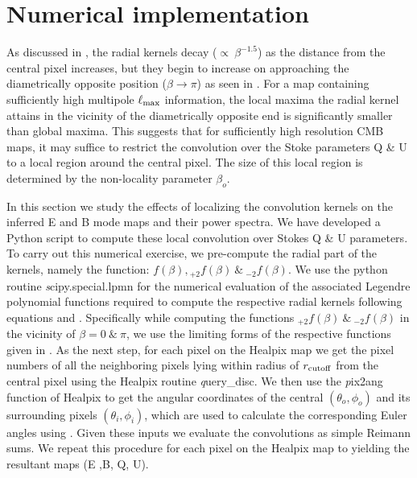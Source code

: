 \section{Numerical implementation} \label{sec:numerical_implementation}

As discussed in , the radial kernels decay ($\propto ~ \beta^{-1.5}$) as the distance from the central pixel increases, but they begin to increase on approaching the diametrically opposite position ($\beta \rightarrow \pi$)  as seen in . For a map containing sufficiently high multipole $\ell_{\rm max}$ information,  the local maxima the radial kernel attains in the vicinity of the diametrically opposite end is significantly smaller than global maxima. This suggests that for sufficiently high resolution CMB maps, it may suffice to restrict the convolution over the Stoke parameters Q \& U to a local region around the central pixel. The size of this local region is determined by the non-locality parameter $\beta_o$. 

In this section we study the effects of localizing the convolution kernels on the inferred E and B mode maps and their power spectra. We have developed a Python script to compute these local convolution over Stokes Q \& U parameters. To carry out this numerical exercise, we pre-compute the radial part of the kernels, namely the function: $f(\beta), {}_{+2}f(\beta) ~\&~ {}_{-2}f(\beta)$. We use the python routine {\textit scipy.special.lpmn} for the numerical evaluation of the associated Legendre polynomial functions required to compute the respective radial kernels following equations  and . Specifically while computing the functions ${}_{+2}f(\beta) ~\&~ {}_{-2}f(\beta)$ in the vicinity of $\beta=0~\&~\pi$, we use the limiting forms of the respective functions given in . As the next step, for each pixel on the Healpix map we get the pixel numbers of all the neighboring pixels lying within radius of $r_{\rm cutoff}$ from the central pixel using the Healpix routine {\textit query\_disc}. We then use the {\textit pix2ang} function of Healpix to get the angular coordinates of the central $(\theta_o,\phi_o)$ and its surrounding pixels $(\theta_i,\phi_i)$, which are used to calculate the corresponding Euler angles using . Given these inputs we evaluate the convolutions as simple Reimann sums. We repeat this procedure for each pixel on the Healpix map to yielding the resultant maps (E ,B, Q, U).

